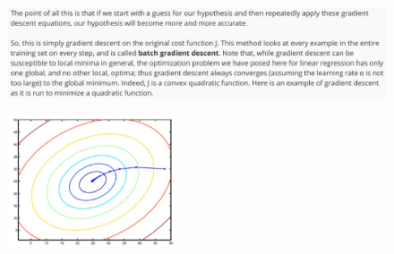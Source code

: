 \documentclass[12pt, A4,onecolumn]{article} %
\begin{document}
\begin{figure}[H]
	\centering
	\includegraphics[width=1\textwidth]{./Imagenes/gradient15}
\end{figure}

\begin{figure}[H]
	\centering
	\includegraphics[width=0.45\textwidth]{./Imagenes/gradient16}
\end{figure}
\end{document}
